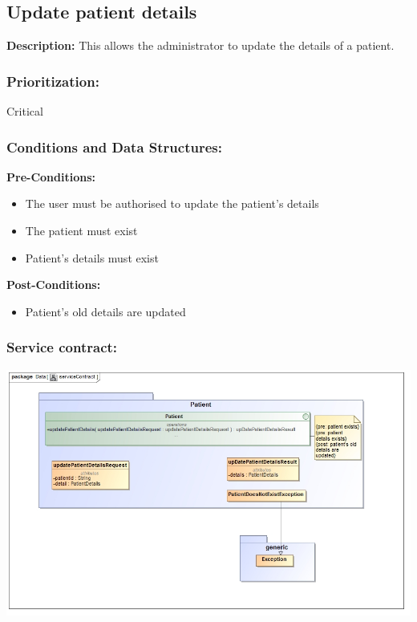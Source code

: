 \subsection{Update patient details}
\textbf{Description:}
This allows the administrator to update the details of a patient.
\subsubsection{Prioritization:}
Critical
\subsubsection{Conditions and Data Structures:}
\textbf{Pre-Conditions:}
	\begin{itemize}
	\item The user must be authorised to update the patient's details
	\item The patient must exist
	\item Patient's details must exist
	\end{itemize}
\textbf{Post-Conditions:}
	\begin{itemize}
	\item Patient's old details are updated
	\end{itemize}	
\subsubsection{Service contract:}
\includegraphics[width=1\linewidth]{./Graphics/2.jpg}

